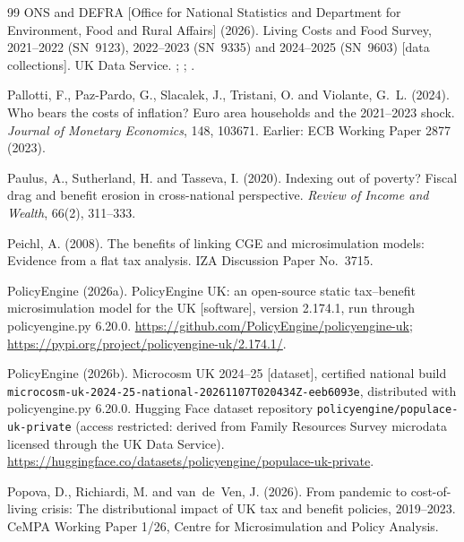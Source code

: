 \begin{thebibliography}{99}
ONS and DEFRA [Office for National Statistics and Department for Environment, Food and Rural Affairs] (2026).
\newblock Living Costs and Food Survey, 2021--2022 (SN~9123), 2022--2023 (SN~9335) and 2024--2025 (SN~9603) [data collections].
\newblock UK Data Service. ; ; .

Pallotti, F., Paz-Pardo, G., Slacalek, J., Tristani, O. and Violante, G.~L. (2024).
\newblock Who bears the costs of inflation? Euro area households and the 2021--2023 shock.
\newblock \emph{Journal of Monetary Economics}, 148, 103671. Earlier: ECB Working Paper 2877 (2023).

Paulus, A., Sutherland, H. and Tasseva, I. (2020).
\newblock Indexing out of poverty? Fiscal drag and benefit erosion in cross-national perspective.
\newblock \emph{Review of Income and Wealth}, 66(2), 311--333.

Peichl, A. (2008).
\newblock The benefits of linking CGE and microsimulation models: Evidence from a flat tax analysis.
\newblock IZA Discussion Paper No.~3715.

PolicyEngine (2026a).
\newblock PolicyEngine UK: an open-source static tax--benefit microsimulation model for the UK [software], version 2.174.1, run through policyengine.py 6.20.0.
\newblock \url{https://github.com/PolicyEngine/policyengine-uk}; \url{https://pypi.org/project/policyengine-uk/2.174.1/}.

PolicyEngine (2026b).
\newblock Microcosm UK 2024--25 [dataset], certified national build \texttt{microcosm-uk-2024-25-national-20261107T020434Z-eeb6093e}, distributed with policyengine.py 6.20.0.
\newblock Hugging Face dataset repository \texttt{policyengine/populace-uk-private} (access restricted: derived from Family Resources Survey microdata licensed through the UK Data Service). \url{https://huggingface.co/datasets/policyengine/populace-uk-private}.

Popova, D., Richiardi, M. and van~de~Ven, J. (2026).
\newblock From pandemic to cost-of-living crisis: The distributional impact of UK tax and benefit policies, 2019--2023.
\newblock CeMPA Working Paper 1/26, Centre for Microsimulation and Policy Analysis.


\end{thebibliography}
